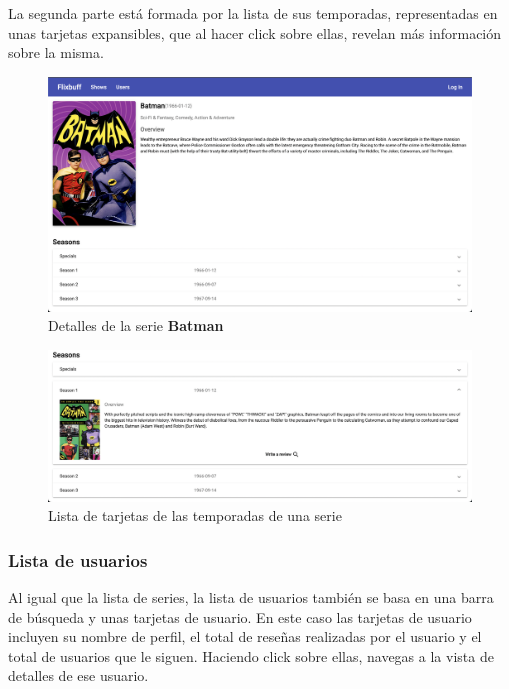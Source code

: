 La segunda parte está formada por la lista de sus temporadas, representadas en unas tarjetas expansibles, que al hacer
click sobre ellas, revelan más información sobre la misma. \\

\begin{figure}[H]
    \centering	
        \includegraphics[scale=0.25]{img/show-details.png}
    \caption{ Detalles de la serie \textbf{Batman} }\label{fig:show-details}
\end{figure}

\begin{figure}[H]
    \centering	
        \includegraphics[scale=0.25]{img/expanded-season.png}
    \caption{ Lista de tarjetas de las temporadas de una serie }\label{fig:expanded-season}
\end{figure}

\subsubsection{Lista de usuarios}
Al igual que la lista de series, la lista de usuarios también se basa en una barra de búsqueda y unas tarjetas de
usuario. En este caso las tarjetas de usuario incluyen su nombre de perfil, el total de reseñas realizadas por el
usuario y el total de usuarios que le siguen. Haciendo click sobre ellas, navegas a la vista de detalles de ese
usuario.\\

